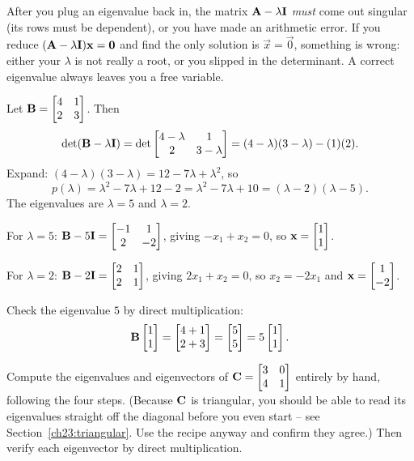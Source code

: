 \begin{trapbox}
After you plug an eigenvalue back in, the matrix $\mathbf{A}-\lambda\mathbf{I}$ \emph{must}
come out singular (its rows must be dependent), or you have made an arithmetic
error. If you reduce $(\mathbf{A}-\lambda\mathbf{I})\mathbf{x}=\mathbf{0}$ and find the only
solution is $\vec{x}=\vec{0}$, something is wrong: either your $\lambda$ is not
really a root, or you slipped in the determinant. A correct eigenvalue always
leaves you a free variable.
\end{trapbox}

\begin{example}
\label{ch23:ex-nonsym}
Let $\mathbf{B}=\begin{bmatrix}4 & 1\\ 2 & 3\end{bmatrix}$. Then
\[
  \det(\mathbf{B}-\lambda\mathbf{I})
  =\det\begin{bmatrix}4-\lambda & 1\\ 2 & 3-\lambda\end{bmatrix}
  =(4-\lambda)(3-\lambda)-(1)(2).
\]
Expand: $(4-\lambda)(3-\lambda)=12-7\lambda+\lambda^2$, so
\[
  p(\lambda)=\lambda^2-7\lambda+12-2=\lambda^2-7\lambda+10=(\lambda-2)(\lambda-5).
\]
The eigenvalues are $\lambda=5$ and $\lambda=2$.

For $\lambda=5$: $\mathbf{B}-5\mathbf{I}=\begin{bmatrix}-1&1\\2&-2\end{bmatrix}$, giving
$-x_1+x_2=0$, so $\mathbf{x}=\begin{bmatrix}1\\1\end{bmatrix}$.

For $\lambda=2$: $\mathbf{B}-2\mathbf{I}=\begin{bmatrix}2&1\\2&1\end{bmatrix}$, giving
$2x_1+x_2=0$, so $x_2=-2x_1$ and $\mathbf{x}=\begin{bmatrix}1\\-2\end{bmatrix}$.

Check the eigenvalue $5$ by direct multiplication:
\[
  \mathbf{B}\begin{bmatrix}1\\1\end{bmatrix}=\begin{bmatrix}4+1\\2+3\end{bmatrix}=\begin{bmatrix}5\\5\end{bmatrix}=5\begin{bmatrix}1\\1\end{bmatrix}.
\]
\end{example}

\begin{labbox}
Compute the eigenvalues and eigenvectors of
$\mathbf{C}=\begin{bmatrix}3 & 0\\ 4 & 1\end{bmatrix}$ entirely by hand, following
the four steps. (Because $\mathbf{C}$ is triangular, you should be able to read its
eigenvalues straight off the diagonal before you even start -- see
Section~\ref{ch23:triangular}. Use the recipe anyway and confirm they agree.)
Then verify each eigenvector by direct multiplication.
\end{labbox}

